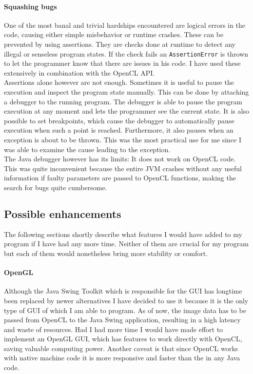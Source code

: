 \documentclass[12pt,a4paper,titlepage]{article}
\begin{document}
	\paragraph{Squashing bugs}
	One of the most banal and trivial hardships encountered are logical errors in the code, causing either simple misbehavior or runtime crashes. These can be prevented by using assertions. They are checks done at runtime to detect any illegal or senseless program states. If the check fails an \verb|AssertionError| is thrown to let the programmer know that there are issues in his code. I have used these extensively in combination with the OpenCL API.\\
	Assertions alone however are not enough. Sometimes it is useful to pause the execution and inspect the program state manually. This can be done by attaching a debugger to the running program. The debugger is able to pause the program execution at any moment and lets the programmer see the current state. It is also possible to set breakpoints, which cause the debugger to automatically pause execution when such a point is reached. Furthermore, it also pauses when an exception is about to be thrown. This was the most practical use for me since I was able to examine the cause leading to the exception.\\
	The Java debugger however has its limits: It does not work on OpenCL code. This was quite inconvenient because the entire JVM crashes without any useful information if faulty parameters are passed to OpenCL functions, making the search for bugs quite cumbersome.
	\subsection{Possible enhancements}\label{sec:poss_enh}
	The following sections shortly describe what features I would have added to my program if I have had any more time. Neither of them are crucial for my program but each of them would nonetheless bring more stability or comfort.
	\paragraph{OpenGL}
	Although the Java Swing Toolkit which is responsible for the GUI has longtime been replaced by newer alternatives I have decided to use it because it is the only type of GUI of which I am able to program. As of now, the image data has to be passed from OpenCL to the Java Swing application, resulting in a high latency and waste of resources. Had I had more time I would have made effort to implement an OpenGL GUI, which has features to work directly with OpenCL, saving valuable computing power. Another caveat is that since OpenCL works with native machine code it is more responsive and faster than the in any Java code.
\end{document}
